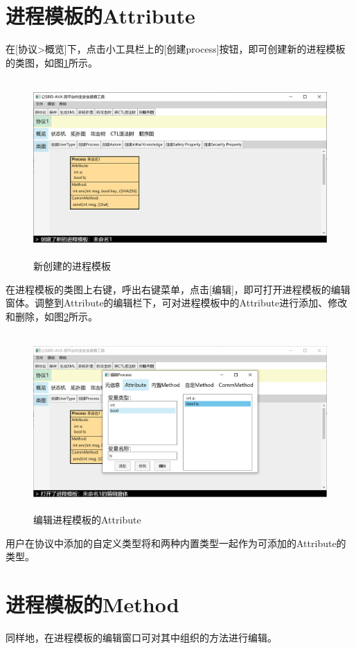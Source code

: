 \section{进程模板的Attribute}
在[协议>概览]下，点击小工具栏上的[创建process]按钮，即可创建新的进程模板的类图，如图\ref{create_process}所示。
\begin{figure}[h]
	\centering
	\includegraphics[width=12cm,height=6.75cm]{imgs/create_process.png}
	\caption{新创建的进程模板}
	\label{create_process}
\end{figure}
\par
在进程模板的类图上右键，呼出右键菜单，点击[编辑]，即可打开进程模板的编辑窗体。调整到Attribute的编辑栏下，可对进程模板中的Attribute进行添加、修改和删除，如图\ref{process_edit_attribute}所示。
\begin{figure}[h]
	\centering
	\includegraphics[width=12cm,height=6.75cm]{imgs/process_edit_attribute.png}
	\caption{编辑进程模板的Attribute}
	\label{process_edit_attribute}
\end{figure}
\par
用户在协议中添加的自定义类型将和两种内置类型一起作为可添加的Attribute的类型。

\section{进程模板的Method}
同样地，在进程模板的编辑窗口可对其中组织的方法进行编辑。
